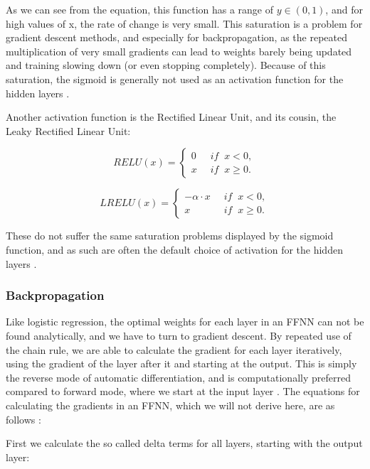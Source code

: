 \documentclass[onecolumn,10pt,cleanfoot]{asme2ej}
\begin{document}
As we can see from the equation, this function has a range of $y \in (0,1)$, and for high values of x, the rate of change is very small. This saturation is a problem for gradient descent methods, and especially for backpropagation, as the repeated multiplication of very small gradients can lead to weights barely being updated and training slowing down (or even stopping completely). Because of this saturation, the sigmoid is generally not used as an activation function for the hidden layers \cite[191]{gbc}.

Another activation function is the Rectified Linear Unit, and its cousin, the Leaky Rectified Linear Unit:

\begin{equation}
RELU(x) = \left\{\begin{array}{cc} 0 & \; \; if \; \; x < 0, \\  x & \; \; if \; \; x \ge 0.\end{array}\right.
\end{equation}

\begin{equation}
LRELU(x) = \left\{\begin{array}{cc} -\alpha \cdot x & \; \; if \; \; x < 0, \\  x & \; \; if \; \; x \ge 0.\end{array}\right.
\end{equation}

These do not suffer the same saturation problems displayed by the sigmoid function, and as such are often the default choice of activation for the hidden layers \cite[188]{gbc}.

\subsubsection{Backpropagation}

Like logistic regression, the optimal weights for each layer in an FFNN can not be found analytically, and we have to turn to gradient descent. By repeated use of the chain rule, we are able to calculate the gradient for each layer iteratively, using the gradient of the layer after it and starting at the output. This is simply the reverse mode of automatic differentiation, and is computationally preferred compared to forward mode, where we start at the input layer \cite[416]{sr}. The equations for calculating the gradients in an FFNN, which we will not derive here, are as follows \cite{morten}:

First we calculate the so called delta terms for all layers, starting with the output layer:
\end{document}
